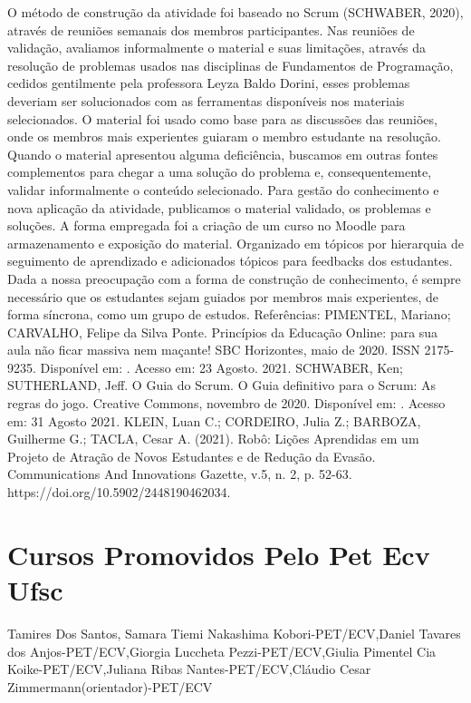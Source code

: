 O método de construção da atividade foi baseado no Scrum (SCHWABER, 2020), através de
reuniões semanais dos membros participantes. Nas reuniões de validação, avaliamos
informalmente o material e suas limitações, através da resolução de problemas usados nas
disciplinas de Fundamentos de Programação, cedidos gentilmente pela professora Leyza Baldo
Dorini, esses problemas deveriam ser solucionados com as ferramentas disponíveis nos materiais
selecionados.
O material foi usado como base para as discussões das reuniões, onde os membros mais
experientes guiaram o membro estudante na resolução. Quando o material apresentou alguma
deficiência, buscamos em outras fontes complementos para chegar a uma solução do problema e,
consequentemente, validar informalmente o conteúdo selecionado.
Para gestão do conhecimento e nova aplicação da atividade, publicamos o material validado, os
problemas e soluções. A forma empregada foi a criação de um curso no Moodle para
armazenamento e exposição do material. Organizado em tópicos por hierarquia de seguimento de
aprendizado e adicionados tópicos para feedbacks dos estudantes. Dada a nossa preocupação
com a forma de construção de conhecimento, é sempre necessário que os estudantes sejam
guiados por membros mais experientes, de forma síncrona, como um grupo de estudos.
Referências:
PIMENTEL, Mariano; CARVALHO, Felipe da Silva Ponte. Princípios da Educação Online: para
sua aula não ficar massiva nem maçante! SBC Horizontes, maio de 2020. ISSN 2175-9235.
Disponível em: .
Acesso em: 23 Agosto. 2021.
SCHWABER, Ken; SUTHERLAND, Jeff. O Guia do Scrum. O Guia definitivo para o Scrum:
As regras do jogo. Creative Commons, novembro de 2020. Disponível em:
.
Acesso em: 31 Agosto 2021.
KLEIN, Luan C.; CORDEIRO, Julia Z.; BARBOZA, Guilherme G.; TACLA, Cesar A. (2021).
Robô: Lições Aprendidas em um Projeto de Atração de Novos Estudantes e de Redução da
Evasão. Communications And Innovations Gazette, v.5, n. 2, p. 52-63.
https://doi.org/10.5902/2448190462034.




\section*{Cursos Promovidos Pelo Pet Ecv Ufsc}

Tamires Dos Santos, Samara Tiemi Nakashima Kobori-PET/ECV,Daniel Tavares dos Anjos-PET/ECV,Giorgia Luccheta Pezzi-PET/ECV,Giulia Pimentel Cia Koike-PET/ECV,Juliana Ribas Nantes-PET/ECV,Cláudio Cesar Zimmermann(orientador)-PET/ECV

